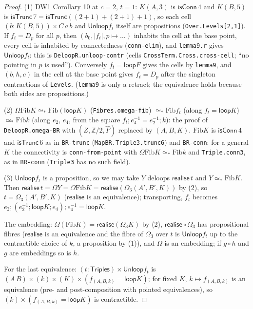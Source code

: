 \documentclass[11pt]{amsart}
\theoremstyle{definition}
\theoremstyle{remark}
\newcommand{\Om}{\Omega}
\newcommand{\code}[1]{\texttt{#1}}
\newcommand{\cT}{\mathsf{isTrunc}}
\newcommand{\cC}{\mathsf{isConn}}
\newcommand{\Fib}{\mathrm{Fib}}
\newcommand{\Tri}{\mathsf{Triples}}
\newcommand{\Unloop}{\mathsf{Unloop}}
\newcommand{\real}{\mathsf{realise}}
\newcommand{\pteq}{\simeq_*}
\newcommand{\lp}{\mathsf{loop}}
\newcommand{\Z}{\mathbb{Z}}
\begin{document}
\begin{proof}
(1) DW1 Corollary 10 at $c=2$, $t=1$: $K(A,3)$ is $\cC\,4$ and $K(B,5)$ is
$\cT\,7=\cT((2+1)+(2+1)+1)$, so each cell $(b:K(B,5))\times C\,a\,b$ and
$\Unloop f_t$ itself are propositions (\code{Over.Levels[2,1]}). If
$f_t=D_p$ for all $p$, then $(b_0,|f_t|,p\mapsto\ldots)$ inhabits the cell at the
base point, every cell is inhabited by connectedness (\code{conn-elim}), and
\code{lemma9.r} gives $\Unloop f_t$: this is \code{DeloopR.unloop-contr} (cells
\code{CrossTerm.Cross.cross-cell}; ``no pointing in $p$ is used''). Conversely
$f_t=\lp F$ gives the cells by \code{lemma9}, and $(b,h,c)$ in the cell at the
base point gives $f_t=D_p$ after the singleton contractions of \code{Levels}.
(\code{lemma9} is only a retract; the equivalence holds because both sides
are propositions.)

(2) $\Om\Fib K\pteq\Fib(\lp K)$ (\code{Fibres.omega-fib}) $\pteq\Fib f_t$ (along
$f_t=\lp K$) $\pteq\Fib k$ (along $e_2$, $e_4$, from the square
$f_t;e_4^{-1}=e_2^{-1};k$): the proof of \code{DeloopR.omega-BR} with $(Z,\Z/2,\hat
F)$ replaced by $(A,B,K)$. $\Fib K$ is $\cC\,4$ and $\cT\,6$ as in
\code{BR-trunc} (\code{MapBR.Triple3.trunc6}) and \code{BR-conn}: for a
general $K$ the connectivity is \code{conn-from-point} with
$\Om\Fib K\pteq\Fib k$ and \code{Triple.conn3}, as in \code{BR-conn}
(\code{Triple3} has no such field).

(3) $\Unloop f_t$ is a proposition, so we may take $Y$ deloops $\real\,t$ and
$Y\pteq\Fib K$. Then $\real\,t=\Om Y=\Om\Fib K=\real(\Om_3(A',B',K))$ by (2), so
$t=\Om_3(A',B',K)$ ($\real$ is an equivalence); transporting, $f_t$ becomes
$e_2;(e_2^{-1};\lp K;e_4);e_4^{-1}=\lp K$.

The embedding: $\Om(\Fib K)=\real(\Om_3 K)$ by (2), $\real\circ\Om_3$ has
propositional fibres ($\real$ is an equivalence and the fibre of $\Om_3$ over
$t$ is $\Unloop f_t$ up to the contractible choice of $k$, a proposition by
(1)), and $\Om$ is an embedding; if $g\circ h$ and $g$ are embeddings so is $h$.

For the last equivalence: $(t:\Tri)\times\Unloop f_t$ is
$(A\,B)\times(k)\times(K)\times(f_{(A,B,k)}=\lp K)$; for fixed $K$,
$k\mapsto f_{(A,B,k)}$ is an equivalence (pre- and post-composition with pointed
equivalences), so $(k)\times(f_{(A,B,k)}=\lp K)$ is contractible.
\end{proof}
\end{document}
